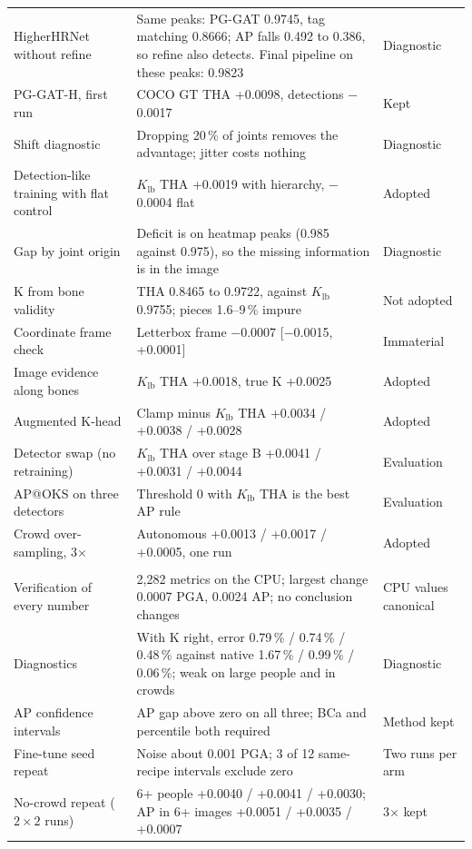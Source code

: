 \documentclass[11pt,a4paper]{article}
\newcommand{\Klb}{K_{\mathrm{lb}}}
\begin{document}
\begin{xltabular}{\linewidth}{@{}P{4.2cm}LP{2.15cm}@{}}
HigherHRNet without refine & Same peaks: PG-GAT 0.9745, tag matching 0.8666; AP falls 0.492 to 0.386, so refine also detects. Final pipeline on these peaks: 0.9823 & Diagnostic \\
PG-GAT-H, first run & COCO GT THA +0.0098, detections $-$0.0017 & Kept \\
Shift diagnostic & Dropping 20\,\% of joints removes the advantage; jitter costs nothing & Diagnostic \\
Detection-like training with flat control & $\Klb$ THA +0.0019 with hierarchy, $-$0.0004 flat & Adopted \\
Gap by joint origin & Deficit is on heatmap peaks (0.985 against 0.975), so the missing information is in the image & Diagnostic \\
K from bone validity & THA 0.8465 to 0.9722, against $\Klb$ 0.9755; pieces 1.6--9\,\% impure & Not adopted \\
Coordinate frame check & Letterbox frame $-$0.0007 [$-$0.0015, +0.0001] & Immaterial \\
Image evidence along bones & $\Klb$ THA +0.0018, true K +0.0025 & Adopted \\
Augmented K-head & Clamp minus $\Klb$ THA +0.0034 / +0.0038 / +0.0028 & Adopted \\
Detector swap (no retraining) & $\Klb$ THA over stage B +0.0041 / +0.0031 / +0.0044 & Evaluation \\
AP@OKS on three detectors & Threshold 0 with $\Klb$ THA is the best AP rule & Evaluation \\
Crowd over-sampling, 3$\times$ & Autonomous +0.0013 / +0.0017 / +0.0005, one run & Adopted \\
\addlinespace
{} \\
Verification of every number & 2,282 metrics on the CPU; largest change 0.0007 PGA, 0.0024 AP; no conclusion changes & CPU values canonical \\
Diagnostics & With K right, error 0.79\,\% / 0.74\,\% / 0.48\,\% against native 1.67\,\% / 0.99\,\% / 0.06\,\%; weak on large people and in crowds & Diagnostic \\
AP confidence intervals & AP gap above zero on all three; BCa and percentile both required & Method kept \\
Fine-tune seed repeat & Noise about 0.001 PGA; 3 of 12 same-recipe intervals exclude zero & Two runs per arm \\
No-crowd repeat ($2 \times 2$ runs) & 6+ people +0.0040 / +0.0041 / +0.0030; AP in 6+ images +0.0051 / +0.0035 / +0.0007 & 3$\times$ kept \\

\end{xltabular}
\end{document}

